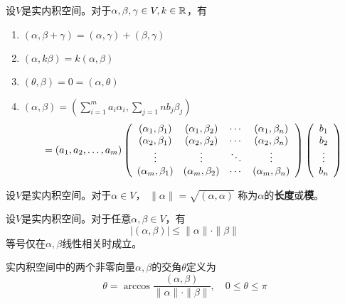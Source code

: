 \begin{theorem}[实内积空间的性质] \label{thrm-real-inner-prod-space-prop}
  设$V$是实内积空间。对于$\alpha,\beta,\gamma\in V, k\in\mfR$，有
  \begin{enumerate}
    \item \label{thrm-RIPS-prop1}
    $(\alpha,\beta+\gamma)=(\alpha,\gamma)+(\beta,\gamma)$
    \item
    $(\alpha,k\beta)=k(\alpha,\beta)$
    \item
    $(\theta,\beta)=0=(\alpha,\theta)$
    \item
    $(\alpha,\beta)=
      \left(\sum_{i=1}^{m}a_i\alpha_i,\sum_{j=1}{n}b_j\beta_j\right) $
    \begin{equation} \label{eq-metric-mat}
      = (a_1,a_2,\dots,a_m) \mmat{cccc}{
        (\alpha_1,\beta_1)&(\alpha_1,\beta_2)&\cdots&(\alpha_1,\beta_n)\\
        (\alpha_2,\beta_1)&(\alpha_2,\beta_2)&\cdots&(\alpha_2,\beta_n)\\
        \vdots            &\vdots            &\ddots&\vdots            \\
        (\alpha_m,\beta_1)&(\alpha_m,\beta_2)&\cdots&(\alpha_m,\beta_n)}
        \mmat{c}{b_1 \\ b_2 \\ \vdots \\ b_n}
    \end{equation}
  \end{enumerate}
\end{theorem}

\begin{definition}[长度]
  设$V$是实内积空间。对于$\alpha\in V$，
  $\| \alpha \| = \sqrt{(\alpha,\alpha)}$
  称为$\alpha$的\textbf{长度}或\textbf{模}。
\end{definition}

\begin{theorem}
  设$V$是实内积空间。对于任意$\alpha,\beta\in V$，有
  \begin{displaymath}
    |(\alpha,\beta)| \le \|\alpha\|\cdot\|\beta\|
  \end{displaymath}
  等号仅在$\alpha,\beta$线性相关时成立。
\end{theorem}

\begin{definition}[交角]
  实内积空间中的两个非零向量$\alpha,\beta$的交角$\theta$定义为
  \begin{displaymath}
    \theta = \arccos\frac{(\alpha,\beta)}{\|\alpha\|\cdot\|\beta\|},
    \quad  0\le\theta\le\pi 
  \end{displaymath}
\end{definition}

